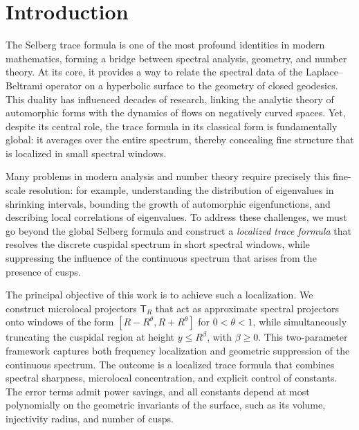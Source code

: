 \section{Introduction}\label{sec:intro}

The Selberg trace formula is one of the most profound identities in modern mathematics, 
forming a bridge between spectral analysis, geometry, and number theory. At its core, it 
provides a way to relate the spectral data of the Laplace--Beltrami operator on a 
hyperbolic surface to the geometry of closed geodesics. This duality has influenced 
decades of research, linking the analytic theory of automorphic forms with the dynamics 
of flows on negatively curved spaces. Yet, despite its central role, the trace formula in 
its classical form is fundamentally global: it averages over the entire spectrum, thereby 
concealing fine structure that is localized in small spectral windows. 

Many problems in modern analysis and number theory require precisely this fine-scale 
resolution: for example, understanding the distribution of eigenvalues in shrinking 
intervals, bounding the growth of automorphic eigenfunctions, and describing local 
correlations of eigenvalues. To address these challenges, we must go beyond the global 
Selberg formula and construct a \emph{localized trace formula} that resolves the discrete 
cuspidal spectrum in short spectral windows, while suppressing the influence of the 
continuous spectrum that arises from the presence of cusps.

The principal objective of this work is to achieve such a localization. We construct 
microlocal projectors $\mathsf{T}_R$ that act as approximate spectral projectors onto 
windows of the form $[R-R^\theta, R+R^\theta]$ for $0<\theta<1$, while simultaneously 
truncating the cuspidal region at height $y \leq R^\beta$, with $\beta \geq 0$. This 
two-parameter framework captures both frequency localization and geometric suppression of 
the continuous spectrum. The outcome is a localized trace formula that combines spectral 
sharpness, microlocal concentration, and explicit control of constants. The error terms 
admit power savings, and all constants depend at most polynomially on the geometric 
invariants of the surface, such as its volume, injectivity radius, and number of cusps.

